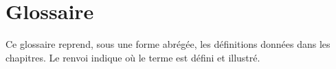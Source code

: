
\chapter{Glossaire}
\label{ann:glossaire}

Ce glossaire reprend, sous une forme abrégée, les définitions données dans
les chapitres. Le renvoi indique où le terme est défini et illustré.

